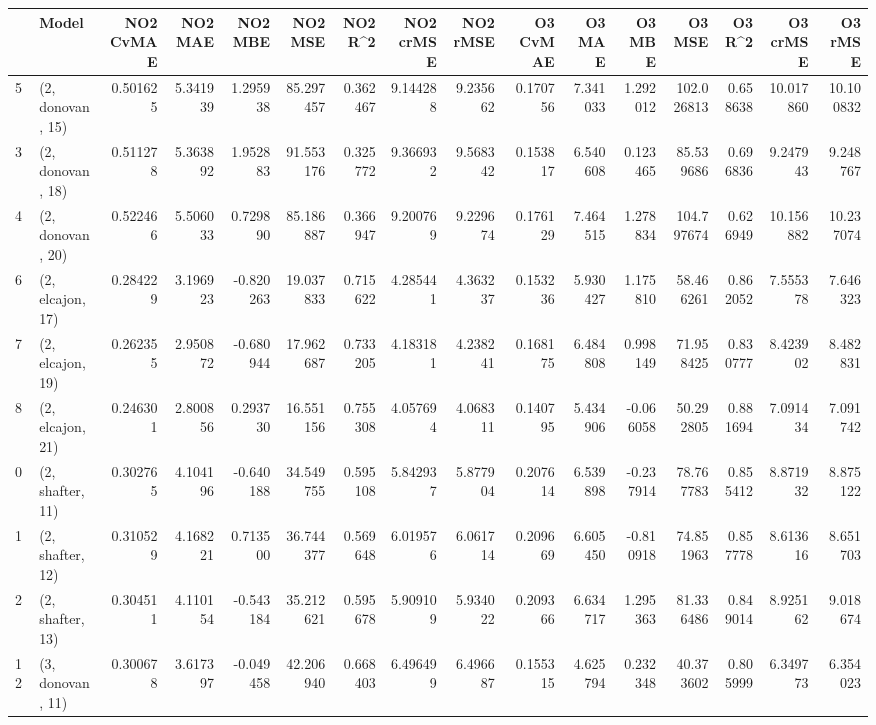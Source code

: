 \begin{tabular}{llrrrrrrrrrrrrrr}
\toprule
{} &             Model &  NO2 CvMAE &   NO2 MAE &   NO2 MBE &    NO2 MSE &   NO2 R\textasciicircum2 &  NO2 crMSE &  NO2 rMSE &  O3 CvMAE &     O3 MAE &    O3 MBE &      O3 MSE &    O3 R\textasciicircum2 &   O3 crMSE &    O3 rMSE \\
\midrule
5  &  (2, donovan, 15) &   0.501625 &  5.341939 &  1.295938 &  85.297457 &  0.362467 &   9.144288 &  9.235662 &  0.170756 &   7.341033 &  1.292012 &  102.026813 &  0.658638 &  10.017860 &  10.100832 \\
3  &  (2, donovan, 18) &   0.511278 &  5.363892 &  1.952883 &  91.553176 &  0.325772 &   9.366932 &  9.568342 &  0.153817 &   6.540608 &  0.123465 &   85.539686 &  0.696836 &   9.247943 &   9.248767 \\
4  &  (2, donovan, 20) &   0.522466 &  5.506033 &  0.729890 &  85.186887 &  0.366947 &   9.200769 &  9.229674 &  0.176129 &   7.464515 &  1.278834 &  104.797674 &  0.626949 &  10.156882 &  10.237074 \\
6  &  (2, elcajon, 17) &   0.284229 &  3.196923 & -0.820263 &  19.037833 &  0.715622 &   4.285441 &  4.363237 &  0.153236 &   5.930427 &  1.175810 &   58.466261 &  0.862052 &   7.555378 &   7.646323 \\
7  &  (2, elcajon, 19) &   0.262355 &  2.950872 & -0.680944 &  17.962687 &  0.733205 &   4.183181 &  4.238241 &  0.168175 &   6.484808 &  0.998149 &   71.958425 &  0.830777 &   8.423902 &   8.482831 \\
8  &  (2, elcajon, 21) &   0.246301 &  2.800856 &  0.293730 &  16.551156 &  0.755308 &   4.057694 &  4.068311 &  0.140795 &   5.434906 & -0.066058 &   50.292805 &  0.881694 &   7.091434 &   7.091742 \\
0  &  (2, shafter, 11) &   0.302765 &  4.104196 & -0.640188 &  34.549755 &  0.595108 &   5.842937 &  5.877904 &  0.207614 &   6.539898 & -0.237914 &   78.767783 &  0.855412 &   8.871932 &   8.875122 \\
1  &  (2, shafter, 12) &   0.310529 &  4.168221 &  0.713500 &  36.744377 &  0.569648 &   6.019576 &  6.061714 &  0.209669 &   6.605450 & -0.810918 &   74.851963 &  0.857778 &   8.613616 &   8.651703 \\
2  &  (2, shafter, 13) &   0.304511 &  4.110154 & -0.543184 &  35.212621 &  0.595678 &   5.909109 &  5.934022 &  0.209366 &   6.634717 &  1.295363 &   81.336486 &  0.849014 &   8.925162 &   9.018674 \\
12 &  (3, donovan, 11) &   0.300678 &  3.617397 & -0.049458 &  42.206940 &  0.668403 &   6.496499 &  6.496687 &  0.155315 &   4.625794 &  0.232348 &   40.373602 &  0.805999 &   6.349773 &   6.354023 \\

\end{tabular}
